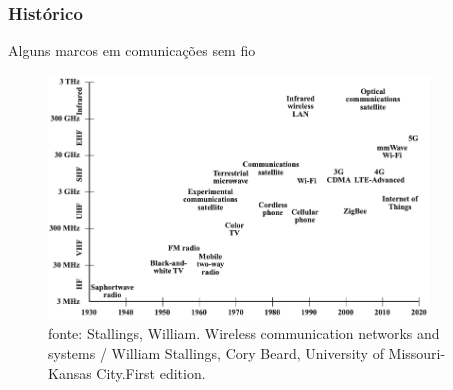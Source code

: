 \documentclass[10pt,xcolor=table]{beamer}
\begin{document}
\begin{frame}
\frametitle{Histórico}
    Alguns marcos em comunicações sem fio\\
    \vspace{2mm}
	\begin{figure}[htbp]
    	\includegraphics[width=0.9\textwidth]{figuras/milestonesredessemfio.png}\\
     	\tiny fonte: Stallings, William. Wireless communication networks and systems / William Stallings, Cory Beard, University of Missouri-Kansas City.First edition.
	\end{figure}
\end{frame}
\end{document}
